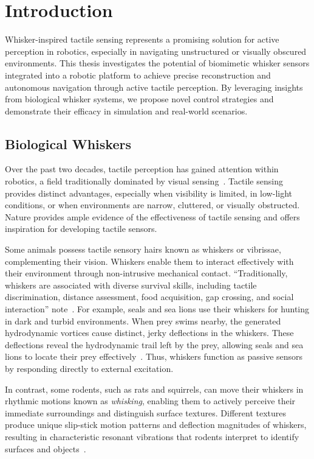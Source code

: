 

\chapter{Introduction}

Whisker-inspired tactile sensing represents a promising solution for active perception in robotics, especially in navigating unstructured or visually obscured environments.
This thesis investigates the potential of biomimetic whisker sensors integrated into a robotic platform to achieve precise reconstruction and autonomous navigation through active tactile perception.
By leveraging insights from biological whisker systems, we propose novel control strategies and demonstrate their efficacy in simulation and real-world scenarios.


\section{Biological Whiskers}

Over the past two decades, tactile perception has gained attention within robotics, a field traditionally dominated by visual sensing~\cite{s22072705}.
Tactile sensing provides distinct advantages, especially when visibility is limited, in low-light conditions, or when environments are narrow, cluttered, or visually obstructed.
Nature provides ample evidence of the effectiveness of tactile sensing and offers inspiration for developing tactile sensors.

Some animals possess tactile sensory hairs known as whiskers or vibrissae, complementing their vision.
Whiskers enable them to interact effectively with their environment through non-intrusive mechanical contact.
\enquote{Traditionally, whiskers are associated with diverse survival skills, including tactile discrimination, distance assessment, food acquisition, gap crossing, and social interaction} note~\textcite{IBARRACASTANEDA2022100034}.
For example, seals and sea lions use their whiskers for hunting in dark and turbid environments.
When prey swims nearby, the generated hydrodynamic vortices cause distinct, jerky deflections in the whiskers.
These deflections reveal the hydrodynamic trail left by the prey, allowing seals and sea lions to locate their prey effectively~\cite{muthuramalingam2018sealsealionwhiskers}.
Thus, whiskers function as passive sensors by responding directly to external excitation.

In contrast, some rodents, such as rats and squirrels, can move their whiskers in rhythmic motions known as \textit{whisking}, enabling them to actively perceive their immediate surroundings and distinguish surface textures.
Different textures produce unique slip-stick motion patterns and deflection magnitudes of whiskers, resulting in characteristic resonant vibrations that rodents interpret to identify surfaces and objects~\cite{wolfe2008texture}.

